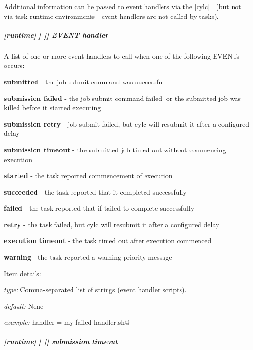 Additional information can be passed to event handlers via the
[cylc] \textrightarrow [[environment]] (but not via task
runtime environments - event handlers are not called by tasks).

\subparagraph[EVENT handler]{[runtime] \textrightarrow [[\_\_NAME\_\_]] \textrightarrow [[[events]]] \textrightarrow EVENT handler}

A list of one or more event handlers to call when one of the following EVENTs occurs:
\begin{myitemize}
    \item {\bf submitted}      - the job submit command was successful
    \item {\bf submission failed}  - the job submit command failed, or the
                                   submitted job was killed before it started executing
    \item {\bf submission retry}   - job submit failed, but cylc will resubmit it
                                   after a configured delay
    \item {\bf submission timeout} - the submitted job timed out without commencing execution

    \item {\bf started}        - the task reported commencement of execution
    \item {\bf succeeded}      - the task reported that it completed successfully
    \item {\bf failed}         - the task reported that if tailed to complete successfully
    \item {\bf retry}          - the task failed, but cylc will resubmit it
                                  after a configured delay
    \item {\bf execution timeout}        - the task timed out after execution commenced
    \item {\bf warning}        - the task reported a warning priority message
\end{myitemize}

Item details:
\begin{myitemize}
    \item {\em type:} Comma-separated list of strings (event handler scripts).
    \item {\em default:} None
    \item {\em example:} \lstinline@failed handler = my-failed-handler.sh@
\end{myitemize}

\subparagraph[submission timeout]{[runtime] \textrightarrow [[\_\_NAME\_\_]] \textrightarrow [[[events]]] \textrightarrow submission timeout}
\label{runtime-event-hooks-submission-timeout}

